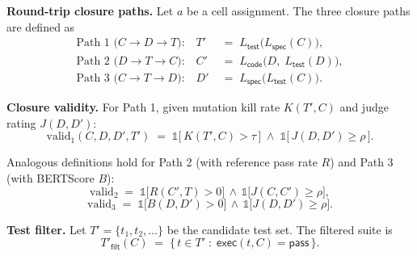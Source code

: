 
\textbf{Round-trip closure paths.} Let $a$ be a cell assignment.
The three closure paths are defined as
\begin{align}
  \text{Path 1 (}C \to D \to T\text{):} \quad
  T' &\;=\; L_{\textsf{test}}\bigl(L_{\textsf{spec}}(C)\bigr), \label{eq:path1}\\
  \text{Path 2 (}D \to T \to C\text{):} \quad
  C' &\;=\; L_{\textsf{code}}\bigl(D,\; L_{\textsf{test}}(D)\bigr), \label{eq:path2}\\
  \text{Path 3 (}C \to T \to D\text{):} \quad
  D' &\;=\; L_{\textsf{spec}}\bigl(L_{\textsf{test}}(C)\bigr). \label{eq:path3}
\end{align}


\textbf{Closure validity.} For Path 1, given mutation kill rate
$K(T', C)$ and judge rating $J(D, D')$:
\begin{equation}
  \text{valid}_1(C, D, D', T')
  \;=\;
  \mathds{1}\!\bigl[\, K(T', C) > \tau \,\bigr]
  \;\wedge\;
  \mathds{1}\!\bigl[\, J(D, D') \geq \rho \,\bigr].
  \label{eq:valid1}
\end{equation}

Analogous definitions hold for Path 2 (with reference pass rate $R$) and
Path 3 (with BERTScore $B$):
\begin{equation}
  \text{valid}_2 \;=\; \mathds{1}\!\bigl[R(C', T) > 0\bigr] \,\wedge\, \mathds{1}\!\bigl[J(C, C') \geq \rho\bigr],
  \label{eq:valid2}
\end{equation}
\begin{equation}
  \text{valid}_3 \;=\; \mathds{1}\!\bigl[B(D, D') > 0\bigr] \,\wedge\, \mathds{1}\!\bigl[J(D, D') \geq \rho\bigr].
  \label{eq:valid3}
\end{equation}


\textbf{Test filter.} Let $T' = \{t_1, t_2, \ldots\}$ be the candidate test
set. The filtered suite is
\begin{equation}
  T'_{\textsf{filt}}(C)
  \;=\;
  \bigl\{\, t \in T' \;:\; \textsf{exec}(t, C) = \textsf{pass} \,\bigr\}.
  \label{eq:filter}
\end{equation}

